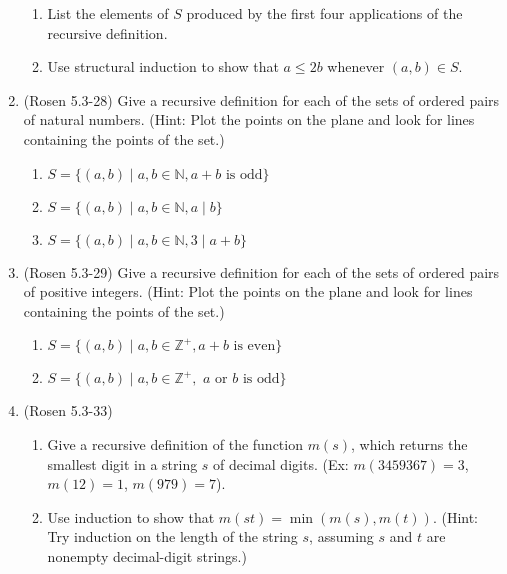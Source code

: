 \begin{enumerate}
\begin{enumerate}
\item \streasy List the elements of $S$ produced by the first four applications 
of the recursive definition.

\item \strmedium Use structural induction to show that $a \leq 2b$ whenever 
$(a,b)\in S$.
\end{enumerate}

\item (Rosen 5.3-28) Give a recursive definition for each of the 
sets of ordered pairs of natural numbers. 
(Hint: Plot the points on the plane and look for lines containing 
the points of the set.)

\begin{enumerate}
\item \streasy $S=\{(a,b)  \mid  a,b\in \mathbb{N}, a+b \text{~is odd}\}$

\item \strmedium $S=\{(a,b)  \mid  a,b\in \mathbb{N}, a  \mid  b\}$

\item \strmedium $S=\{(a,b)  \mid  a,b\in \mathbb{N}, 3  \mid  a+b\}$
\end{enumerate}

\item (Rosen 5.3-29) Give a recursive definition for each of the 
sets of ordered pairs of positive integers. 
(Hint: Plot the points on the plane and look for lines containing 
the points of the set.)

\begin{enumerate}
\item \strmedium $S=\{(a,b)  \mid  a,b\in \mathbb{Z}^+, a+b \text{~is even}\}$

\item \strmedium $S=\{(a,b)  \mid  a,b\in \mathbb{Z}^+, \text{~$a$ or $b$ is odd}\}$
\end{enumerate}

\item (Rosen 5.3-33) 
\begin{enumerate}
\item \strmedium Give a recursive definition of the function $m(s)$, which returns the smallest
digit in a string $s$ of decimal digits.
(Ex: $m(3459367)=3$, $m(12)=1$, $m(979)=7$).

\item \strhard Use induction to show that $m(st) = \min(m(s),m(t))$.
(Hint: Try induction on the length of the string $s$, assuming $s$ and $t$ are nonempty decimal-digit strings.)


\end{enumerate}
\end{enumerate}
